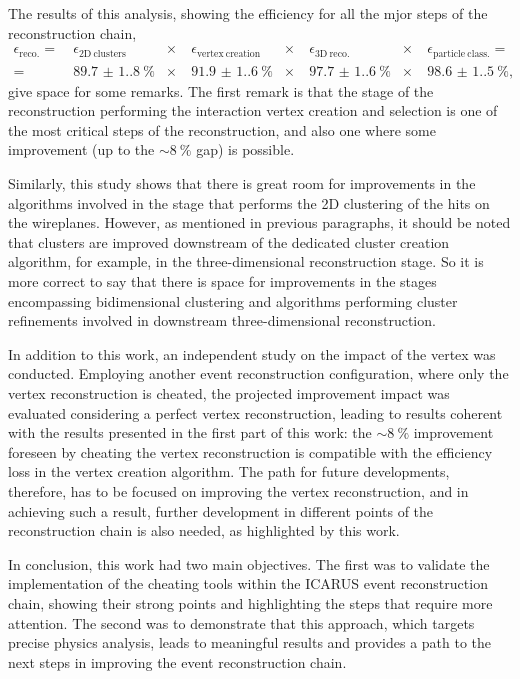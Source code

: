 The results of this analysis, showing the efficiency for all the mjor steps of the reconstruction chain, \begin{equation*}
    \begin{aligned}
        \epsilon_\mathrm{reco.} =&\
        \epsilon_\mathrm{2D\ clusters} &\times&\ 
        \epsilon_\mathrm{vertex\ creation} &\times&\ 
        \epsilon_\mathrm{3D\ reco.} &\times&\ 
        \epsilon_\mathrm{particle\ class.} =\\  
        =&\ \SI{89.7(1.8)}{\percent} &\times&\ 
        \SI{91.9(1.6)}{\percent} &\times&\ 
        \SI{97.7(1.6)}{\percent} &\times&\ 
        \SI{98.6(1.5)}{\percent},
    \end{aligned}
\end{equation*} give space for some remarks. The first remark is that the stage of the reconstruction performing the interaction vertex creation and selection is one of the most critical steps of the reconstruction, and also one where some improvement (up to the ${\sim}\SI{8}{\percent}$ gap) is possible. 

Similarly, this study shows that there is great room for improvements in the algorithms involved in the stage that performs the 2D clustering of the hits on the wireplanes. However, as mentioned in previous paragraphs, it should be noted that clusters are improved downstream of the dedicated cluster creation algorithm, for example, in the three-dimensional reconstruction stage. So it is more correct to say that there is space for improvements in the stages encompassing bidimensional clustering and algorithms performing cluster refinements involved in downstream three-dimensional reconstruction. 

In addition to this work, an independent study on the impact of the vertex was conducted. Employing another event reconstruction configuration, where only the vertex reconstruction is cheated, the projected improvement impact was evaluated considering a perfect vertex reconstruction, leading to results coherent with the results presented in the first part of this work: the ${\sim}\SI{8}{\percent}$ improvement foreseen by cheating the vertex reconstruction is compatible with the efficiency loss in the vertex creation algorithm. The path for future developments, therefore, has to be focused on improving the vertex reconstruction, and in achieving such a result, further development in different points of the reconstruction chain is also needed, as highlighted by this work. 

In conclusion, this work had two main objectives. The first was to validate the implementation of the cheating tools within the ICARUS event reconstruction chain, showing their strong points and highlighting the steps that require more attention. The second was to demonstrate that this approach, which targets precise physics analysis, leads to meaningful results and provides a path to the next steps in improving the event reconstruction chain. 

